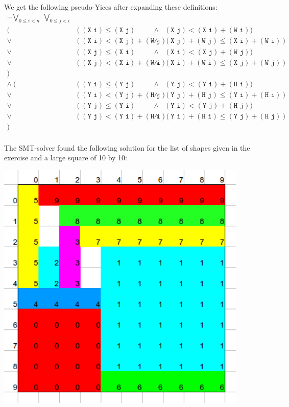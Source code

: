 \documentclass[12pt]{article}
\begin{document}
We get the following pseudo-Yices after expanding these definitions:
\[
    \begin{array}{rlcl}
        \neg \bigvee_{0 \le i < n} ~ \bigvee_{0 \le j < i} & & & \\
            (~~~ & (~(\texttt{X i}) \le (\texttt{X j}) & \wedge & (\texttt{X j}) < (\texttt{X i}) + (\texttt{W i}) ) \\
            \vee & (~(\texttt{X i}) < (\texttt{X j}) + (\texttt{W j}) & \wedge & (\texttt{X j}) + (\texttt{W j}) \le (\texttt{X i}) + (\texttt{W i})~) \\
            \vee & (~(\texttt{X j}) \le (\texttt{X i}) & \wedge & (\texttt{X i}) < (\texttt{X j}) + (\texttt{W j}) ) \\
            \vee & (~(\texttt{X j}) < (\texttt{X i}) + (\texttt{W i}) & \wedge & (\texttt{X i}) + (\texttt{W i}) \le (\texttt{X j}) + (\texttt{W j})~) \\
            )~~~ & & & \\
     \wedge~(~~~ & (~(\texttt{Y i}) \le (\texttt{Y j}) & \wedge & (\texttt{Y j}) < (\texttt{Y i}) + (\texttt{H i}) ) \\
            \vee & (~(\texttt{Y i}) < (\texttt{Y j}) + (\texttt{H j}) & \wedge & (\texttt{Y j}) + (\texttt{H j}) \le (\texttt{Y i}) + (\texttt{H i})~) \\
            \vee & (~(\texttt{Y j}) \le (\texttt{Y i}) & \wedge & (\texttt{Y i}) < (\texttt{Y j}) + (\texttt{H j}) ) \\
            \vee & (~(\texttt{Y j}) < (\texttt{Y i}) + (\texttt{H i}) & \wedge & (\texttt{Y i}) + (\texttt{H i}) \le (\texttt{Y j}) + (\texttt{H j})~) \\
            )~~~ & & & \\
    \end{array}
\]

The SMT-solver found the following solution for the list of shapes given in the exercise and a large square of 10 by 10:\\
\begin{center}
    \includegraphics[width=12cm]{rectangles.png}
\end{center}
\end{document}
